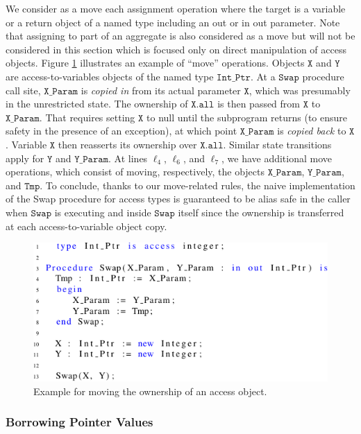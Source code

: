 \documentclass{llncs}
\newcommand\var[1]{\ensuremath{\mathtt{#1}}}
\newcommand{\keyword}[1]{\textsf{#1}}
\begin{document}
\smallskip
We consider as a move each assignment operation where the target is a variable or a return object of a named type including an \keyword{out} or \keyword{in out} parameter.
Note that assigning to part of an aggregate is also considered as a move but will not be considered in this section which is focused only on direct manipulation of access objects.
Figure \ref{fig:move_ex1} illustrates an example of ``move'' operations. Objects \var{X} and \var{Y} are access-to-variables objects of the named type \var{Int\_Ptr}. At a \var{Swap} procedure call site,
\var{X\_Param} is \textit{copied in} from its actual parameter \var{X}, which was presumably in the unrestricted state. The ownership of \var{X.all} is then passed from \var{X} to \var{X\_Param}.
That requires setting \var{X} to null until the subprogram returns (to ensure safety in the presence of an exception), at which point \var{X\_Param} is \textit{copied back} to \var{X}.
Variable \var{X} then reasserts its ownership over \var{X.all}. Similar state transitions apply for \var{Y} and \var{Y\_Param}.  At lines $\ell_4$, $\ell_6$, and $\ell_7$,
we have additional move operations, which consist of moving, respectively, the objects \var{X\_Param}, \var{Y\_Param}, and \var{Tmp}. To conclude, thanks to our move-related rules, the naive
implementation of the Swap procedure for access types is guaranteed to be alias safe in the caller when \var{Swap} is executing and inside \var{Swap} itself since the ownership is transferred
at each access-to-variable object copy. 

\begin{figure}[htb!]
\centering
   \includegraphics[]{move_ex1}
   \caption{Example for moving the ownership of an access object.}
   \label{fig:move_ex1}
\end{figure}
 

\subsubsection{Borrowing Pointer Values}
\label{sec:borrowing}
\ \\
\end{document}
